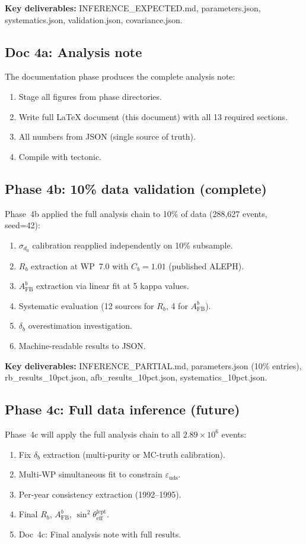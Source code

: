 \documentclass[11pt,a4paper]{article}
\begin{document}
\textbf{Key deliverables:} INFERENCE\_EXPECTED.md, parameters.json, systematics.json,
validation.json, covariance.json.

\subsection{Doc 4a: Analysis note}

The documentation phase produces the complete analysis note:
\begin{enumerate}
\item Stage all figures from phase directories.
\item Write full LaTeX document (this document) with all 13 required sections.
\item All numbers from JSON (single source of truth).
\item Compile with tectonic.
\end{enumerate}

\subsection{Phase 4b: 10\% data validation (complete)}

Phase~4b applied the full analysis chain to 10\% of data (288,627 events, seed=42):
\begin{enumerate}
\item $\sigma_{d_0}$ calibration reapplied independently on 10\% subsample.
\item $R_b$ extraction at WP~7.0 with $C_b = 1.01$ (published ALEPH).
\item $A_\mathrm{FB}^b$ extraction via linear fit at 5 kappa values.
\item Systematic evaluation (12 sources for $R_b$, 4 for $A_\mathrm{FB}^b$).
\item $\delta_b$ overestimation investigation.
\item Machine-readable results to JSON.
\end{enumerate}

\textbf{Key deliverables:} INFERENCE\_PARTIAL.md, parameters.json (10\% entries),
rb\_results\_10pct.json, afb\_results\_10pct.json, systematics\_10pct.json.

\subsection{Phase 4c: Full data inference (future)}

Phase~4c will apply the full analysis chain to all $2.89 \times 10^6$ events:
\begin{enumerate}
\item Fix $\delta_b$ extraction (multi-purity or MC-truth calibration).
\item Multi-WP simultaneous fit to constrain $\varepsilon_\mathrm{uds}$.
\item Per-year consistency extraction (1992--1995).
\item Final $R_b$, $A_\mathrm{FB}^b$, $\sin^2\theta_\mathrm{eff}^\mathrm{lept}$.
\item Doc~4c: Final analysis note with full results.
\end{enumerate}
\end{document}
